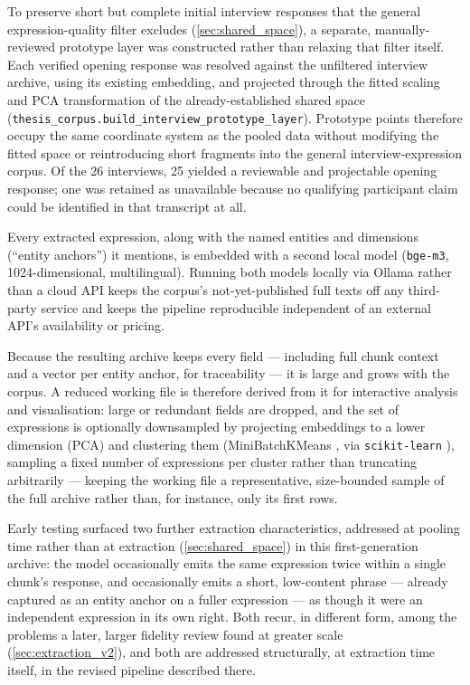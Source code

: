 To preserve short but complete initial interview responses that the general expression-quality filter excludes (\ref{sec:shared_space}), a separate, manually-reviewed prototype layer was constructed rather than relaxing that filter itself. Each verified opening response was resolved against the unfiltered interview archive, using its existing embedding, and projected through the fitted scaling and PCA transformation of the already-established shared space (\texttt{thesis\_corpus.build\_interview\_prototype\_layer}). Prototype points therefore occupy the same coordinate system as the pooled data without modifying the fitted space or reintroducing short fragments into the general interview-expression corpus. Of the 26 interviews, 25 yielded a reviewable and projectable opening response; one was retained as unavailable because no qualifying participant claim could be identified in that transcript at all.

Every extracted expression, along with the named entities and dimensions (\enquote{entity anchors}) it mentions, is embedded with a second local model (\texttt{bge-m3}, 1024-dimensional, multilingual). Running both models locally via Ollama rather than a cloud API keeps the corpus's not-yet-published full texts off any third-party service and keeps the pipeline reproducible independent of an external API's availability or pricing.

Because the resulting archive keeps every field — including full chunk context and a vector per entity anchor, for traceability — it is large and grows with the corpus. A reduced working file is therefore derived from it for interactive analysis and visualisation: large or redundant fields are dropped, and the set of expressions is optionally downsampled by projecting embeddings to a lower dimension (PCA) and clustering them (MiniBatchKMeans \autocite{sculleyWebscaleKmeansClustering2010}, via \texttt{scikit-learn} \autocite{JMLR:v12:pedregosa11a}), sampling a fixed number of expressions per cluster rather than truncating arbitrarily — keeping the working file a representative, size-bounded sample of the full archive rather than, for instance, only its first rows.

Early testing surfaced two further extraction characteristics, addressed at pooling time rather than at extraction (\ref{sec:shared_space}) in this first-generation archive: the model occasionally emits the same expression twice within a single chunk's response, and occasionally emits a short, low-content phrase — already captured as an entity anchor on a fuller expression — as though it were an independent expression in its own right. Both recur, in different form, among the problems a later, larger fidelity review found at greater scale (\ref{sec:extraction_v2}), and both are addressed structurally, at extraction time itself, in the revised pipeline described there.

